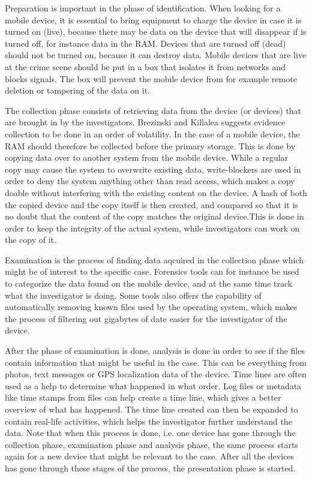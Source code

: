 Preparation is important in the phase of identification. When looking for a mobile device, it is essential to bring equipment to charge the device in case it is turned on (live), because there may be data on the device that will disappear if is turned off, for instance data in the RAM. Devices that are turned off (dead) should not be turned on, because it can destroy data. Mobile devices that are live at the crime scene should be put in a box that isolates it from networks and blocks signals. The box will prevent the mobile device from for example remote deletion or tampering of the data on it\cite{DiFoBook}.

The collection phase consists of retrieving data from the device (or devices) that are brought in by the investigators\cite{DiFoBook}. Brezinski and Killalea\cite{RFC3227} suggests evidence collection to be done in an order of volatility. In the case of a mobile device, the RAM should therefore be collected before the primary storage. This is done by copying data over to another system from the mobile device. While a regular copy may cause the system to overwrite existing data, write-blockers are used in order to deny the system anything other than read access, which makes a copy doable without interfering with the existing content on the device. A hash of both the copied device and the copy itself is then created, and compared so that it is no doubt that the content of the copy matches the original device\cite{DiFoBook}.This is done in order to keep the integrity of the actual system, while investigators can work on the copy of it.

Examination is the process of finding data aqcuired in the collection phase which might be of interest to the specific case. Forensics tools can for instance be used to categorize the data found on the mobile device, and at the same time track what the investigator is doing. Some tools also offers the capability of automatically removing known files used by the operating system, which makes the process of filtering out gigabytes of date easier for the investigator of the device.

After the phase of examination is done, analysis is done in order to see if the files contain information that might be useful in the case. This can be everything from photos, text messages or GPS localization data of the device. Time lines are often used as a help to determine what happened in what order. Log files or metadata like time stamps from files can help create a time line, which gives a better overview of what has happened. The time line created can then be expanded to contain real-life activities, which helps the investigator further understand the data. Note that when this process is done, i.e. one device has gone through the collection phase, examination phase and analysis phase, the same process starts again for a new device that might be relevant to the case. After all the devices has gone through these stages of the process, the presentation phase is started.
